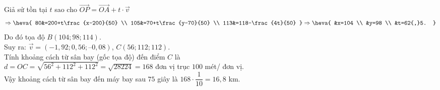 \begin{bt}
{		Giả sử  tồn tại $t$ sao cho $\overrightarrow{OP}=\overrightarrow{OA}+t\cdot \overrightarrow{v}$
		 $$\Rightarrow \heva{
		80&=200+t\frac{x-200}{50}  \\
		105&=70+t\frac{y-70}{50} \\ 
		113&=118-\frac{4t}{50} 
		} \Rightarrow \heva{ 
		&x=104 \\ 
		&y=98 \\ 
		 &t=62{,}5.
		} $$ 
		Do  đó tọa độ $B(104;98;114)$.\\
		 Suy ra: $\overrightarrow{v}=(-1,92; 0,56; – 0,08)$, $C (56;112;112).$\\
		Tính khoảng cách từ sân bay (gốc tọa độ) đến điểm  $C$ là\\
		$d=OC=\sqrt{56^2+112^2+112^2}=\sqrt{28224}=168$ đơn vị trục $100$ mét/ đơn vị.\\ 
		Vậy khoảng cách từ sân bay đến máy bay sau $75$ giây là $168  \cdot \dfrac{1}{10}=16{,}8$ km.
	} 
\end{bt}

